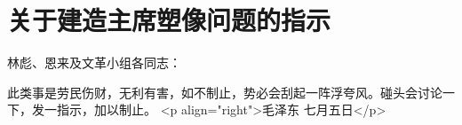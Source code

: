 \section[关于建造主席塑像问题的指示（一九六七年七月五日）]{关于建造主席塑像问题的指示}


林彪、恩来及文革小组各同志：

此类事是劳民伤财，无利有害，如不制止，势必会刮起一阵浮夸风。碰头会讨论一下，发一指示，加以制止。
<p align="right">毛泽东
七月五日</p>


